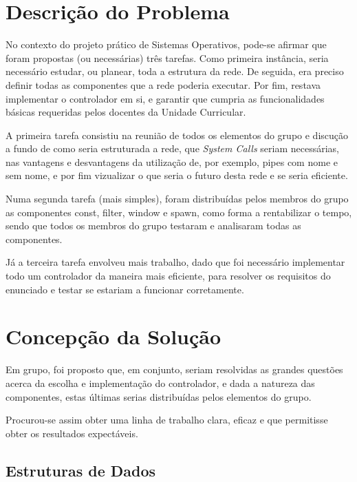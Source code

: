 \documentclass[a4paper]{article}
\begin{document}
\section{Descrição do Problema}
\label{sec:2}

\hspace{3mm} No contexto do projeto prático de Sistemas Operativos, pode-se afirmar que foram propostas (ou necessárias) três tarefas. Como primeira instância, seria necessário estudar, ou planear, toda a estrutura da rede. De seguida, era preciso definir todas as componentes que a rede poderia executar. Por fim, restava implementar o controlador em si, e garantir que cumpria as funcionalidades básicas requeridas pelos docentes da Unidade Curricular.
\par A primeira tarefa consistiu na reunião de todos os elementos do grupo e discução a fundo de como seria estruturada a rede, que \emph{System Calls} seriam necessárias, nas vantagens e desvantagens da utilização de, por exemplo, pipes com nome e sem nome, e por fim vizualizar o que seria o futuro desta rede e se seria eficiente.
\par Numa segunda tarefa (mais simples), foram distribuídas pelos membros do grupo as componentes const, filter, window e spawn, como forma a rentabilizar o tempo, sendo que todos os membros do grupo testaram e analisaram todas as componentes.
\par Já a terceira tarefa envolveu mais trabalho, dado que foi necessário implementar todo um controlador da maneira mais eficiente, para resolver os requisitos do enunciado e testar se estariam a funcionar corretamente.



\section{Concepção da Solução}
\label{sec:3}

\hspace{3mm} Em grupo, foi proposto que, em conjunto, seriam resolvidas as grandes questões acerca da escolha e implementação do controlador, e dada a natureza das componentes, estas últimas serias distribuídas pelos elementos do grupo.
\par Procurou-se assim obter uma linha de trabalho clara, eficaz e que permitisse obter os resultados expectáveis.



\subsection{Estruturas de Dados} 
\label{sec:4}
\end{document}
